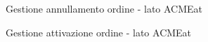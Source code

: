 \documentclass[11pt]{article} %
\begin{document}
\begin{figure}[!ht]
\begin{center}
\caption{Gestione annullamento ordine - lato ACMEat}
\end{center}
\end{figure}

\begin{figure}[!ht]
\begin{center}
\caption{Gestione attivazione ordine - lato ACMEat}
\end{center}
\end{figure}
\end{document}
